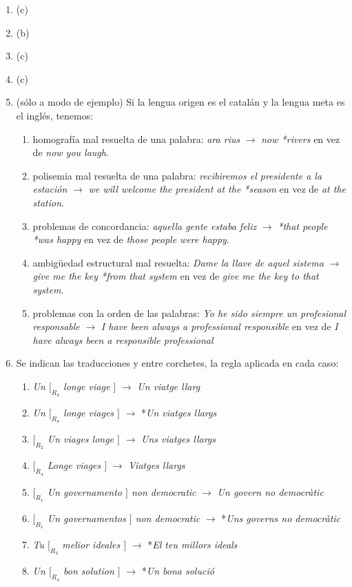 \begin{enumerate}
\item (c) \item (b) \item (c) \item (c) 

\item (sólo a modo de ejemplo) Si la lengua origen es el catalán y la lengua meta es el inglés, tenemos: \begin{enumerate} \item homografía mal resuelta de una palabra: \emph{ara rius} $\to$ \emph{now *rivers} en vez de \emph{now you laugh}. \item polisemia mal resuelta de una palabra: \emph{recibiremos el presidente a la estación} $\to$ \emph{we will welcome the president at the *season} en vez de \emph{at the station}. \item problemas de concordancia: \emph{aquella gente estaba feliz} $\to$ \emph{*that people *was happy} en vez de  \emph{those people were happy}. \item ambigüedad estructural mal resuelta: \emph{Dame la llave de aquel sistema} $\to$ \emph{give me the key *from that system} en vez de  \emph{give me the key to that system}. \item problemas con la orden de las palabras: \emph{Yo he sido siempre un profesional responsable} $\to$ \emph{I have been always a professional responsible} en vez de \emph{I have always been a responsible professional} \end{enumerate} 

\item Se indican las traducciones y entre corchetes, la regla aplicada en cada caso: \begin{enumerate} \item \emph{Un $[_{R_4}$ longe viage $]$} $\to$ \emph{Un viatge llarg} \item \emph{Un $[_{R_4}$ longe viages $]$} $\to$ *\emph{Un viatges llargs} \item \emph{$[_{R_2}$ Un viages longe $]$} $\to$ \emph{Uns viatges llargs} \item \emph{$[_{R_4}$ Longe viages $]$} $\to$ \emph{Viatges llargs} \item \emph{$[_{R_1}$ Un governamento $]$ non democratic} $\to$ \emph{Un govern no democràtic} \item \emph{$[_{R_1}$ Un governamentos $]$ non democratic} $\to$ *\emph{Uns governs no democràtic} \item \emph{Tu $[_{R_4}$ melior ideales $]$} $\to$ *\emph{El teu millors ideals} \item \emph{Un $[_{R_4}$ bon solution $]$} $\to$ *\emph{Un bona solució} \end{enumerate} 


\end{enumerate}
